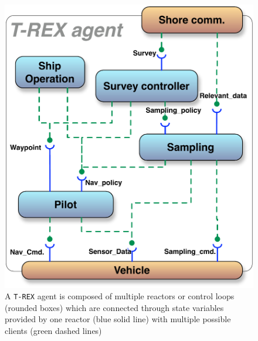 \begin{figure}[!htb]
 \centering
 \includegraphics[scale=0.45]{figs/AUV-agent.pdf}
 \caption{\small A \texttt{T-REX} agent is composed of multiple
   reactors or control loops (rounded boxes) which are connected
   through state variables provided by one reactor ({\color{blue}blue}
   solid line) with multiple possible clients ({\color{green}green}
   dashed lines)}
  \label{fig:agent}
\end{figure}

